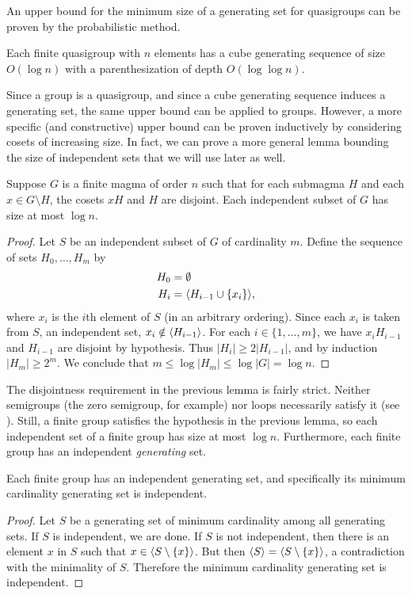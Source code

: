 An upper bound for the minimum size of a generating set for quasigroups can be proven by the probabilistic method.

\begin{lemma}\label{lem:small}
  Each finite quasigroup with $n$ elements has a cube generating sequence of size $O(\log n)$ with a parenthesization of depth $O(\log \log n)$.
\end{lemma}

Since a group is a quasigroup, and since a cube generating sequence induces a generating set, the same upper bound can be applied to groups.
However, a more specific (and constructive) upper bound can be proven inductively by considering cosets of increasing size.
In fact, we can prove a more general lemma bounding the size of independent sets that we will use later as well.

\begin{lemma}\label{lem:magind}
  Suppose $G$ is a finite magma of order $n$ such that for each submagma $H$ and each $x \in G \setminus H$, the cosets $xH$ and $H$ are disjoint.
  Each independent subset of $G$ has size at most $\log n$.
\end{lemma}
\begin{proof}
  Let $S$ be an independent subset of $G$ of cardinality $m$.
  Define the sequence of sets $H_0, \dotsc, H_m$ by
  \begin{align*}
    H_0 & = \emptyset \\
    H_i & = \langle H_{i - 1} \cup \{x_i\} \rangle,
  \end{align*}
  where $x_i$ is the $i$th element of $S$ (in an arbitrary ordering).
  Since each $x_i$ is taken from $S$, an independent set, $x_i \notin \langle H_{i - 1} \rangle$.
  For each $i \in \{1, \dotsc, m\}$, we have $x_i H_{i - 1}$ and $H_{i - 1}$ are disjoint by hypothesis.
  Thus $|H_i| \geq 2 |H_{i - 1}|$, and by induction $|H_m| \geq 2^m$.
  We conclude that $m \leq \log |H_m| \leq \log |G| = \log n$.
\end{proof}

The disjointness requirement in the previous lemma is fairly strict.
Neither semigroups (the zero semigroup, for example) nor loops necessarily satisfy it (see \autocite[Section~I.2]{pflugfelder90}).
Still, a finite group satisfies the hypothesis in the previous lemma, so each independent set of a finite group has size at most $\log n$.
Furthermore, each finite group has an independent \emph{generating} set.

\begin{lemma}
  Each finite group has an independent generating set, and specifically its minimum cardinality generating set is independent.
\end{lemma}
\begin{proof}
  Let $S$ be a generating set of minimum cardinality among all generating sets.
  If $S$ is independent, we are done.
  If $S$ is not independent, then there is an element $x$ in $S$ such that $x \in \langle S \setminus \{x\} \rangle$.
  But then $\langle S \rangle = \langle S \setminus \{x\} \rangle$, a contradiction with the minimality of $S$.
  Therefore the minimum cardinality generating set is independent.
\end{proof}

